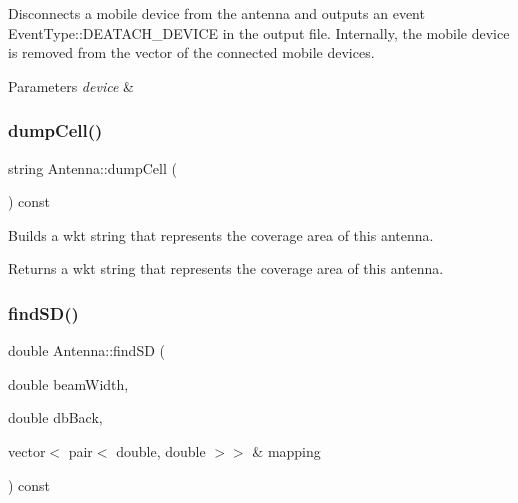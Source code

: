 Disconnects a mobile device from the antenna and outputs an event Event\+Type\+::\+D\+E\+A\+T\+A\+C\+H\+\_\+\+D\+E\+V\+I\+CE in the output file. Internally, the mobile device is removed from the vector of the connected mobile devices. 
\begin{DoxyParams}{Parameters}
{\em device} & \\
\hline
\end{DoxyParams}
\mbox{\label{class_antenna_a8ed18205ff7c675868090e4c80454c2c}} 
\subsubsection{\texorpdfstring{dump\+Cell()}{dumpCell()}}
{\footnotesize\ttfamily string Antenna\+::dump\+Cell (\begin{DoxyParamCaption}{ }\end{DoxyParamCaption}) const}

Builds a wkt string that represents the coverage area of this antenna. \begin{DoxyReturn}{Returns}
a wkt string that represents the coverage area of this antenna. 
\end{DoxyReturn}
\mbox{\label{class_antenna_affb34fcbb958e09bd48a2c3069e06ac8}} 
\subsubsection{\texorpdfstring{find\+S\+D()}{findSD()}}
{\footnotesize\ttfamily double Antenna\+::find\+SD (\begin{DoxyParamCaption}\item[{double}]{beam\+Width,  }\item[{double}]{db\+Back,  }\item[{vector$<$ pair$<$ double, double $>$$>$ \&}]{mapping }\end{DoxyParamCaption}) const\hspace{0.3cm}{\ttfamily [private]}}

\mbox{\label{class_antenna_a7a3919b137b91c1f8f13d620bc7657ed}} 

